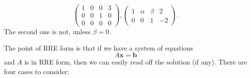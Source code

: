 \documentclass[12pt]{report}
\theoremstyle{definition}
\begin{document}
\begin{ex}
    \[
        \begin{pmatrix}
            1 & 0 & 0 & 3\\
            0 & 0 & 1 & 0\\
            0 & 0 & 0 & 0
        \end{pmatrix}, \begin{pmatrix}
            1 & \alpha & \beta & 2\\
            0 & 0 & 1 & -2
        \end{pmatrix}.
    \]
    The second one is not, unless $\beta = 0$.
\end{ex}

The point of RRE form is that if we have a system of equations\[
    A\mathbf{x} = \mathbf{b}
\]and $A$ is in RRE form, then we can easily read off the solution (if any).
There are four cases to consider:
\end{document}
